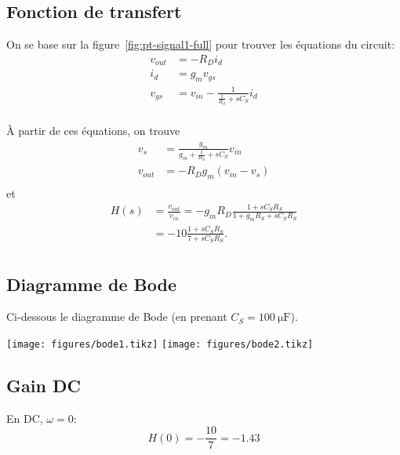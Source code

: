 \documentclass[frenchb]{scrartcl}
\begin{document}
\subsection*{Fonction de transfert}

On se base sur la figure~\ref{fig:pt-signal1-full} pour trouver les équations du circuit:
\begin{align*}
    v_{out} &= -R_D i_d \\
    i_d &= g_m v_{gs} \\
    v_{gs} &= v_{in} - \frac{1}{\frac{1}{R_S} + sC_S} i_d \\
\end{align*}

À partir de ces équations, on trouve
\begin{align*}
    v_s &= \frac{g_m}{g_m + \frac{1}{R_S} + s C_S} v_{in} \\
    v_{out} &= -R_D g_m \left(v_{in} - v_s\right) \\
\end{align*}
et
\begin{align*}
    H(s) &= \frac{v_{out}}{v_{in}}
        = -g_m R_D\frac{1 + s C_S R_S}{1 + g_m R_S + s C_S R_S} \\
        &= -10\frac{1 + s C_S R_S}{7 + s C_S R_S}. \\
\end{align*}

\subsection*{Diagramme de Bode}

Ci-dessous le diagramme de Bode (en prenant $C_S = \SI{100}{\micro\farad}$).
\begin{center}
    \texttt{[image: figures/bode1.tikz]}
    \texttt{[image: figures/bode2.tikz]}
\end{center}

\subsection*{Gain DC}
En DC, $\omega = 0$:
\[H(0) = -\frac{10}{7} = -1.43\]
\end{document}
